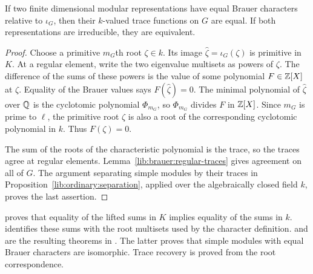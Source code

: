 \begin{proposition}
\label{lib:brauer:separation}
If two finite dimensional modular representations have equal Brauer
characters relative to $\iota_G$, then their $k$-valued trace functions
on $G$ are equal. If both representations are irreducible, they are
equivalent.
\end{proposition}
\begin{proof}
Choose a primitive $m_G$th root $\zeta\in k$. Its image
$\widehat\zeta=\iota_G(\zeta)$ is primitive in $K$. At a regular element,
write the two eigenvalue multisets as powers of $\zeta$. The difference
of the sums of these powers is the value of some polynomial
$F\in\mathbb Z[X]$ at $\zeta$. Equality of the Brauer values says
$F(\widehat\zeta)=0$. The minimal polynomial of $\widehat\zeta$ over
$\mathbb Q$ is the cyclotomic polynomial $\Phi_{m_G}$, so
$\Phi_{m_G}$ divides $F$ in $\mathbb Z[X]$. Since $m_G$ is prime to
$\ell$, the primitive root $\zeta$ is also a root of the corresponding
cyclotomic polynomial in $k$. Thus $F(\zeta)=0$.

The sum of the roots of the characteristic polynomial is the trace, so the traces
agree at regular elements. Lemma~\ref{lib:brauer:regular-traces} gives
agreement on all of $G$. The argument separating simple modules by their traces in
Proposition~\ref{lib:ordinary:separation}, applied over the algebraically
closed field $k$, proves the last assertion.
\end{proof}

\begin{implementation}
 proves that
equality of the lifted sums in $K$ implies equality of the sums in $k$.
 identifies these sums with the
root multisets used by the character definition.
and
are the resulting theorems in .
The latter proves that simple modules with equal Brauer characters are
isomorphic. Trace recovery is proved from the root correspondence.
\end{implementation}

